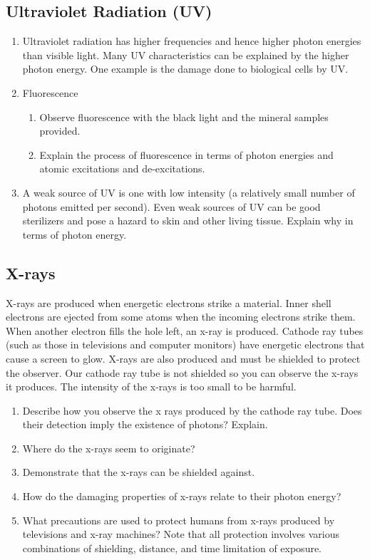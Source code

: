\begin{multicols}{2}
	
\subsection {Ultraviolet Radiation (UV)}
\begin{enumerate}
	\item Ultraviolet radiation has higher frequencies and hence higher photon energies than visible light.  Many UV characteristics can be explained by the higher photon energy.  One example is the damage done to biological cells by UV.
	\item Fluorescence
	\begin{enumerate}
		\item Observe fluorescence with the black light and the mineral samples provided.
		\item Explain the process of fluorescence in terms of photon energies and atomic excitations and de-excitations.
	\end{enumerate}
	\item A weak source of UV is one with low intensity (a relatively small number of photons emitted per second).  Even weak sources of UV can be good sterilizers and pose a hazard to skin and other living tissue.  Explain why in terms of photon energy.
\end{enumerate}
	
\subsection {X-rays}
X-rays are produced when energetic electrons strike a material.  Inner shell electrons are ejected from some atoms when the incoming electrons strike them.  When another electron fills the hole left, an x-ray is produced.  Cathode ray tubes (such as those in televisions and computer monitors) have energetic electrons that cause a screen to glow.  X-rays are also produced and must be shielded to protect the observer.  Our cathode ray tube is not shielded so you can observe the x-rays it produces.  The intensity of the x-rays is too small to be harmful.
\begin{enumerate}
	\item Describe how you observe the x rays produced by the cathode ray tube.  Does their detection imply the existence of photons?  Explain.
	\item Where do the x-rays seem to originate?
	\item Demonstrate that the x-rays can be shielded against.
	\item How do the damaging properties of x-rays relate to their photon energy?
	\item What precautions are used to protect humans from x-rays produced by televisions and x-ray machines?  Note that all protection involves various combinations of shielding, distance, and time limitation of exposure.
\end{enumerate}


\end{multicols}
